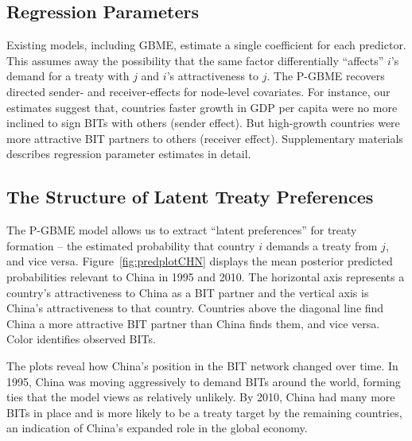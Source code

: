 \documentclass[a4paper, 12pt]{article}
\begin{document}
\subsection{Regression Parameters}

Existing models, including GBME, estimate a single coefficient for each predictor. This assumes away the possibility that the same factor differentially ``affects'' $i$'s demand for a treaty with $j$ and $i$'s attractiveness to $j$.  The P-GBME recovers directed sender- and receiver-effects for node-level covariates. For instance, our estimates suggest that, countries faster growth in GDP per capita were no more inclined to sign BITs with others (sender effect).  But high-growth countries were more attractive BIT partners to others (receiver effect). Supplementary materials describes regression parameter estimates in detail.

\subsection{The Structure of Latent Treaty Preferences}

The P-GBME model allows us to extract ``latent preferences'' for treaty formation -- the estimated probability that country $i$ demands a treaty from $j$, and vice versa. Figure~\ref{fig:predplotCHN} displays the mean posterior predicted probabilities relevant to China in 1995 and 2010. The horizontal axis represents a country's attractiveness to China as a BIT partner and the vertical axis is China's attractiveness to that country. Countries above the diagonal line find China a more attractive BIT partner than China finds them, and vice versa.  Color identifies observed BITs.

The plots reveal how China's position in the BIT network changed over time. In 1995, China was moving aggressively to demand BITs around the world, forming ties that the model views as relatively unlikely. By 2010, China had many more BITs in place and is more likely to be a treaty target by the remaining countries, an indication of China's expanded role in the global economy.  
\end{document}
